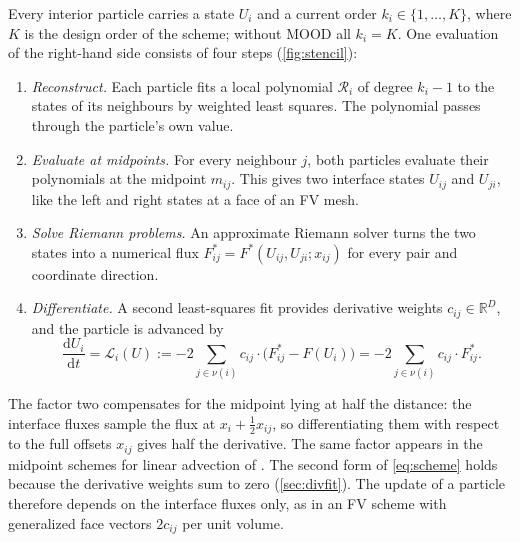 \documentclass[11pt,a4paper]{article}
\numberwithin{equation}{section}
\newcommand{\R}{\mathbb{R}}
\newcommand{\dd}{\mathrm{d}}
\newcommand{\nb}{\nu}
\newcommand{\Lop}{\mathcal{L}}
\newcommand{\Fs}{F^{*}}
\begin{document}
Every interior particle carries a state $U_i$ and a current order $k_i\in\{1,\dots,K\}$, where $K$ is the design order of the scheme; without MOOD all $k_i=K$. One evaluation of the right-hand side consists of four steps (\cref{fig:stencil}):
\begin{enumerate}
\item \emph{Reconstruct.} Each particle fits a local polynomial $\mathcal{R}_i$ of degree $k_i-1$ to the states of its neighbours by weighted least squares. The polynomial passes through the particle's own value.
\item \emph{Evaluate at midpoints.} For every neighbour $j$, both particles evaluate their polynomials at the midpoint $m_{ij}$. This gives two interface states $U_{ij}$ and $U_{ji}$, like the left and right states at a face of an FV mesh.
\item \emph{Solve Riemann problems.} An approximate Riemann solver turns the two states into a numerical flux $\Fs_{ij}=\Fs(U_{ij},U_{ji};x_{ij})$ for every pair and coordinate direction.
\item \emph{Differentiate.} A second least-squares fit provides derivative weights $c_{ij}\in\R^D$, and the particle is advanced by
\begin{equation}\label{eq:scheme}
\frac{\dd U_i}{\dd t} = \Lop_i(U) := -2\sum_{j\in\nb(i)} c_{ij}\cdot\big(\Fs_{ij}-F(U_i)\big)
= -2\sum_{j\in\nb(i)} c_{ij}\cdot\Fs_{ij}.
\end{equation}
\end{enumerate}
The factor two compensates for the midpoint lying at half the distance: the interface fluxes sample the flux at $x_i+\tfrac12x_{ij}$, so differentiating them with respect to the full offsets $x_{ij}$ gives half the derivative. The same factor appears in the midpoint schemes for linear advection of \cite{Willems2025}. The second form of \eqref{eq:scheme} holds because the derivative weights sum to zero (\cref{sec:divfit}). The update of a particle therefore depends on the interface fluxes only, as in an FV scheme with generalized face vectors $2c_{ij}$ per unit volume.
\end{document}
